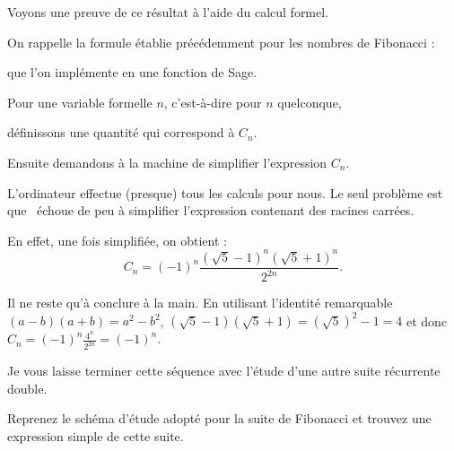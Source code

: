 \change

Voyons une preuve de ce résultat à l'aide du calcul formel.

On rappelle la formule établie précédemment pour les nombres de Fibonacci :

\change

que l'on implémente en une fonction de Sage.

\change

Pour une variable formelle $n$, c'est-à-dire pour $n$ quelconque,

\change

définissons une quantité qui correspond à $C_n$.

\change

Ensuite demandons à la machine de simplifier l'expression $C_n$.

\change
L'ordinateur effectue (presque) tous les calculs pour nous.
Le seul problème est que \Sage\ échoue de peu à simplifier 
l'expression contenant des racines carrées. 

En effet, une fois simplifiée, on obtient :
$$C_n = (-1) ^n \frac{(\sqrt 5 -1)^n (\sqrt 5 + 1)^n}{2^{2n}}.$$

\change
Il ne reste qu'à conclure à la main. 
En utilisant l'identité remarquable $(a-b)(a+b)=a^2-b^2$,
 $(\sqrt 5 -1)(\sqrt 5 + 1) = (\sqrt 5)^2 - 1 = 4$
et donc $C_n = (-1)^n \frac{4^n}{2^{2n}} = (-1)^n$.



\diapo

Je vous laisse terminer cette séquence avec l'étude d'une autre 
suite récurrente double. 

Reprenez le schéma d'étude adopté pour la suite
de Fibonacci et trouvez une expression simple de cette suite.



